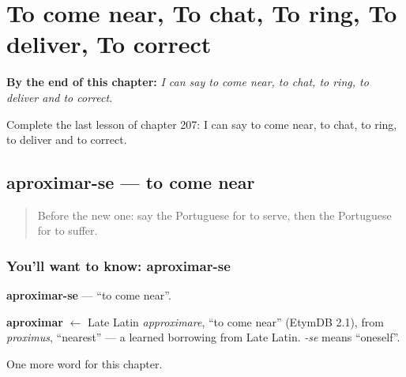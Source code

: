 
\chapter{To come near, To chat, To ring, To deliver, To correct}
\label{ch:pt-to-come-near-to-chat-to-ring-to-deliver-to-correct}

\begin{chapteropening}
\textbf{By the end of this chapter:} \emph{I can say to come near, to chat, to ring, to deliver and to correct.}

Complete the last lesson of chapter 207: I can say to come near, to chat, to ring, to deliver and to correct.
\end{chapteropening}

\section[aproximar-se]{aproximar-se — to come near}

\label{lesson:PT-C207-aproximar-se}



\begin{quote}
Before the new one: say the Portuguese for to serve, then the Portuguese for to suffer.
\end{quote}

\subsection*{You'll want to know: aproximar-se}
\textbf{aproximar-se} — \textquotedblleft{}to come near\textquotedblright{}.

\begin{cousinweb}
\textbf{aproximar} $\leftarrow$ Late Latin \emph{approximare}, \textquotedblleft{}to come near\textquotedblright{} (EtymDB 2.1), from \emph{proximus}, \textquotedblleft{}nearest\textquotedblright{} — a learned borrowing from Late Latin. \emph{-se} means \textquotedblleft{}oneself\textquotedblright{}.
\end{cousinweb}

\begin{grammarlens}[title={What you've built}]
One more word for this chapter.
\end{grammarlens}

